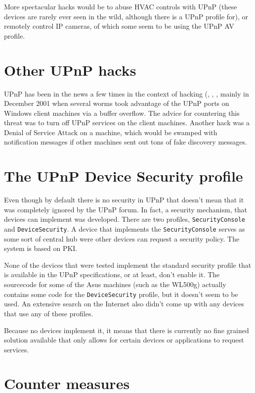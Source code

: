 \documentclass[10pt]{article}
\begin{document}
More spectacular hacks would be to abuse HVAC controls with UPnP (these
devices are rarely ever seen in the wild, although there is a UPnP profile
for), or remotely control IP cameras, of which some seem to be using the UPnP
AV profile.

\section{Other UPnP hacks}

UPnP has been in the news a few times in the context of hacking (\cite{sans},
\cite{schneier}, \cite{overflow2005}, mainly in December 2001 when several
worms took advantage of the UPnP ports on Windows client machines via a buffer
overflow\cite{cve2001-0876}. The advice for countering this threat was to turn
off UPnP services on the client machines. Another hack was a Denial of Service
Attack on a machine, which would be swamped with notification messages if
other machines sent out tons of fake discovery messages\cite{cve2001-0877}.


\section{The UPnP Device Security profile}

Even though by default there is no security in UPnP that doesn't mean that
it was completely ignored by the UPnP forum. In fact, a security mechanism,
that devices can implement was developed. There are two profiles,
\texttt{SecurityConsole} and \texttt{DeviceSecurity}. A device that implements
the \texttt{SecurityConsole} serves as some sort of central hub were other
devices can request a security policy. The system is based on PKI.

None of the devices that were tested implement the standard security profile
that is available in the UPnP specifications, or at least, don't enable it.
The sourcecode for some of the Asus machines (such as the WL500g) actually
contains some code for the \texttt{DeviceSecurity} profile, but it doesn't
seem to be used. An extensive search on the Internet also didn't come up
with any devices that use any of these profiles.

Because no devices implement it, it means that there is currently no fine
grained solution available that only allows for certain devices or
applications to request services.


\section{Counter measures}
\end{document}

